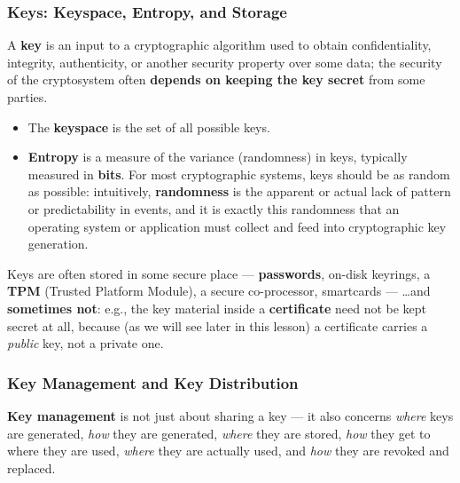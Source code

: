 \documentclass[12pt, a4paper]{article}
\begin{document}
\subsubsection{Keys: Keyspace, Entropy, and Storage}
A \textbf{key} is an input to a cryptographic algorithm used to obtain confidentiality, integrity, authenticity, or another security property over some data; the security of the cryptosystem often \textbf{depends on keeping the key secret} from some parties.
\begin{itemize}
    \item The \textbf{keyspace} is the set of all possible keys.
    \item \textbf{Entropy} is a measure of the variance (randomness) in keys, typically measured in \textbf{bits}. For most cryptographic systems, keys should be as random as possible: intuitively, \textbf{randomness} is the apparent or actual lack of pattern or predictability in events, and it is exactly this randomness that an operating system or application must collect and feed into cryptographic key generation.
\end{itemize}
Keys are often stored in some secure place — \textbf{passwords}, on-disk keyrings, a \textbf{TPM} (Trusted Platform Module), a secure co-processor, smartcards — \dots and \textbf{sometimes not}: e.g., the key material inside a \textbf{certificate} need not be kept secret at all, because (as we will see later in this lesson) a certificate carries a \emph{public} key, not a private one.

\subsubsection{Key Management and Key Distribution}
\textbf{Key management} is not just about sharing a key — it also concerns \emph{where} keys are generated, \emph{how} they are generated, \emph{where} they are stored, \emph{how} they get to where they are used, \emph{where} they are actually used, and \emph{how} they are revoked and replaced.
\end{document}
